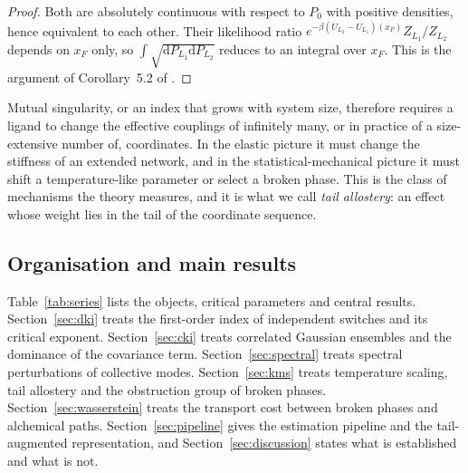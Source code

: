 \documentclass[11pt,reqno]{amsart}
\theoremstyle{plain}
\theoremstyle{definition}
\theoremstyle{remark}
\numberwithin{equation}{section}
\newcommand{\dd}{\mathrm{d}}
\begin{document}
\begin{proof}
Both are absolutely continuous with respect to $P_0$ with positive densities, hence equivalent to each other. Their likelihood ratio $e^{-\beta(U_{L_2}-U_{L_1})(x_F)}Z_{L_1}/Z_{L_2}$ depends on $x_F$ only, so $\int\sqrt{\dd P_{L_1}\dd P_{L_2}}$ reduces to an integral over $x_F$. This is the argument of Corollary~5.2 of \cite{ChenChen2026VII}.
\end{proof}

Mutual singularity, or an index that grows with system size, therefore requires a ligand to change the effective couplings of infinitely many, or in practice of a size-extensive number of, coordinates. In the elastic picture it must change the stiffness of an extended network, and in the statistical-mechanical picture it must shift a temperature-like parameter or select a broken phase. This is the class of mechanisms the theory measures, and it is what we call \emph{tail allostery}: an effect whose weight lies in the tail of the coordinate sequence.

\subsection*{Organisation and main results}
Table~\ref{tab:series} lists the objects, critical parameters and central results. Section~\ref{sec:dki} treats the first-order index of independent switches and its critical exponent. Section~\ref{sec:cki} treats correlated Gaussian ensembles and the dominance of the covariance term. Section~\ref{sec:spectral} treats spectral perturbations of collective modes. Section~\ref{sec:kms} treats temperature scaling, tail allostery and the obstruction group of broken phases. Section~\ref{sec:wasserstein} treats the transport cost between broken phases and alchemical paths. Section~\ref{sec:pipeline} gives the estimation pipeline and the tail-augmented representation, and Section~\ref{sec:discussion} states what is established and what is not.
\end{document}
